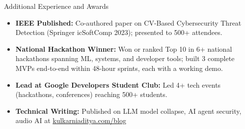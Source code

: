 \documentclass[]{mcdowellcv}
\begin{document}
\begin{cvsection}{Additional Experience and Awards}
  \begin{cvsubsection}{}{}{}
    \begin{itemize}
      \item \textbf{IEEE Published:} Co-authored paper on CV-Based Cybersecurity Threat Detection (Springer icSoftComp 2023); presented to 500+ attendees.
      \item \textbf{National Hackathon Winner:} Won or ranked Top 10 in 6+ national hackathons spanning ML, systems, and developer tools; built 3 complete MVPs end-to-end within 48-hour sprints, each with a working demo.
      \item \textbf{Lead at Google Developers Student Club:} Led 4+ tech events (hackathons, conferences) reaching 500+ students.
      \item \textbf{Technical Writing:} Published on LLM model collapse, AI agent security, audio AI at \href{https://www.kulkarniaditya.com/blog}{kulkarniaditya.com/blog}
    \end{itemize}
  \end{cvsubsection}
\end{cvsection}
\end{document}
